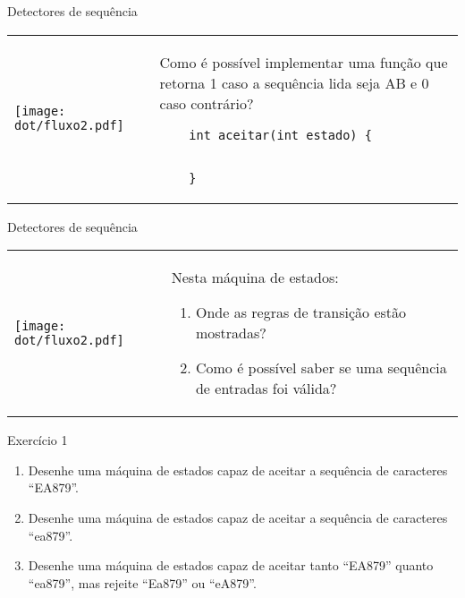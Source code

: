 \documentclass{beamer}
\begin{document}
\begin{frame}[fragile]{Detectores de sequência}
  \centering
  \large
  \begin{tabular}{l m{8cm}}
    \begin{minipage}{.3\textwidth}
      \texttt{[image: dot/fluxo2.pdf]}
    \end{minipage}
  &
    Como é possível implementar uma função que retorna 1 caso a sequência lida
    seja AB e 0 caso contrário?
    \begin{verbatim}
    int aceitar(int estado) {


    }

    \end{verbatim}
    \\
  \end{tabular}
\end{frame}



\begin{frame}[fragile]{Detectores de sequência}
  \centering
  \large
  \begin{tabular}{l m{8cm}}
    \begin{minipage}{.3\textwidth}
   \texttt{[image: dot/fluxo2.pdf]}
    \end{minipage}
  &
    Nesta máquina de estados:
    \begin{enumerate}
    \item Onde as regras de transição estão mostradas?
    \item Como é possível saber se uma sequência de entradas foi válida?
    \end{enumerate}
    \\
  \end{tabular}
\end{frame}

\begin{frame}[fragile]{Exercício 1}
  \centering
  \large
  \begin{enumerate}
    \item Desenhe uma máquina de estados capaz de aceitar a sequência de caracteres ``EA879''.
    \item Desenhe uma máquina de estados capaz de aceitar a sequência de
      caracteres ``ea879''.
    \item Desenhe uma máquina de estados capaz de aceitar tanto ``EA879''
      quanto ``ea879'', mas rejeite ``Ea879'' ou ``eA879''.
  \end{enumerate}
\end{frame}
\end{document}
